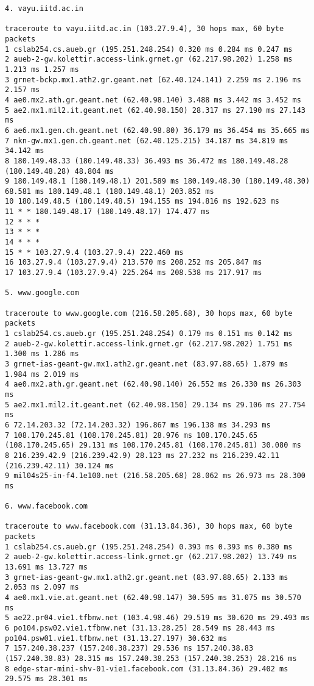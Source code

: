 \documentclass[a4paper]{article}
\begin{document}
\begin{enumerate}
\begin{lstlisting}
4. vayu.iitd.ac.in

traceroute to vayu.iitd.ac.in (103.27.9.4), 30 hops max, 60 byte packets
1 cslab254.cs.aueb.gr (195.251.248.254) 0.320 ms 0.284 ms 0.247 ms
2 aueb-2-gw.kolettir.access-link.grnet.gr (62.217.98.202) 1.258 ms 1.213 ms 1.257 ms
3 grnet-bckp.mx1.ath2.gr.geant.net (62.40.124.141) 2.259 ms 2.196 ms 2.157 ms
4 ae0.mx2.ath.gr.geant.net (62.40.98.140) 3.488 ms 3.442 ms 3.452 ms
5 ae2.mx1.mil2.it.geant.net (62.40.98.150) 28.317 ms 27.190 ms 27.143 ms
6 ae6.mx1.gen.ch.geant.net (62.40.98.80) 36.179 ms 36.454 ms 35.665 ms
7 nkn-gw.mx1.gen.ch.geant.net (62.40.125.215) 34.187 ms 34.819 ms 34.142 ms
8 180.149.48.33 (180.149.48.33) 36.493 ms 36.472 ms 180.149.48.28 (180.149.48.28) 48.804 ms
9 180.149.48.1 (180.149.48.1) 201.589 ms 180.149.48.30 (180.149.48.30) 68.581 ms 180.149.48.1 (180.149.48.1) 203.852 ms
10 180.149.48.5 (180.149.48.5) 194.155 ms 194.816 ms 192.623 ms
11 * * 180.149.48.17 (180.149.48.17) 174.477 ms
12 * * *
13 * * *
14 * * *
15 * * 103.27.9.4 (103.27.9.4) 222.460 ms
16 103.27.9.4 (103.27.9.4) 213.570 ms 208.252 ms 205.847 ms
17 103.27.9.4 (103.27.9.4) 225.264 ms 208.538 ms 217.917 ms

5. www.google.com

traceroute to www.google.com (216.58.205.68), 30 hops max, 60 byte packets
1 cslab254.cs.aueb.gr (195.251.248.254) 0.179 ms 0.151 ms 0.142 ms
2 aueb-2-gw.kolettir.access-link.grnet.gr (62.217.98.202) 1.751 ms 1.300 ms 1.286 ms
3 grnet-ias-geant-gw.mx1.ath2.gr.geant.net (83.97.88.65) 1.879 ms 1.984 ms 2.019 ms
4 ae0.mx2.ath.gr.geant.net (62.40.98.140) 26.552 ms 26.330 ms 26.303 ms
5 ae2.mx1.mil2.it.geant.net (62.40.98.150) 29.134 ms 29.106 ms 27.754 ms
6 72.14.203.32 (72.14.203.32) 196.867 ms 196.138 ms 34.293 ms
7 108.170.245.81 (108.170.245.81) 28.976 ms 108.170.245.65 (108.170.245.65) 29.131 ms 108.170.245.81 (108.170.245.81) 30.080 ms
8 216.239.42.9 (216.239.42.9) 28.123 ms 27.232 ms 216.239.42.11 (216.239.42.11) 30.124 ms
9 mil04s25-in-f4.1e100.net (216.58.205.68) 28.062 ms 26.973 ms 28.300 ms

6. www.facebook.com

traceroute to www.facebook.com (31.13.84.36), 30 hops max, 60 byte packets
1 cslab254.cs.aueb.gr (195.251.248.254) 0.393 ms 0.393 ms 0.380 ms
2 aueb-2-gw.kolettir.access-link.grnet.gr (62.217.98.202) 13.749 ms 13.691 ms 13.727 ms
3 grnet-ias-geant-gw.mx1.ath2.gr.geant.net (83.97.88.65) 2.133 ms 2.053 ms 2.097 ms
4 ae0.mx1.vie.at.geant.net (62.40.98.147) 30.595 ms 31.075 ms 30.570 ms
5 ae22.pr04.vie1.tfbnw.net (103.4.98.46) 29.519 ms 30.620 ms 29.493 ms
6 po104.psw02.vie1.tfbnw.net (31.13.28.25) 28.549 ms 28.443 ms po104.psw01.vie1.tfbnw.net (31.13.27.197) 30.632 ms
7 157.240.38.237 (157.240.38.237) 29.536 ms 157.240.38.83 (157.240.38.83) 28.315 ms 157.240.38.253 (157.240.38.253) 28.216 ms
8 edge-star-mini-shv-01-vie1.facebook.com (31.13.84.36) 29.402 ms 29.575 ms 28.301 ms
        \end{lstlisting}


\end{enumerate}
\end{document}
